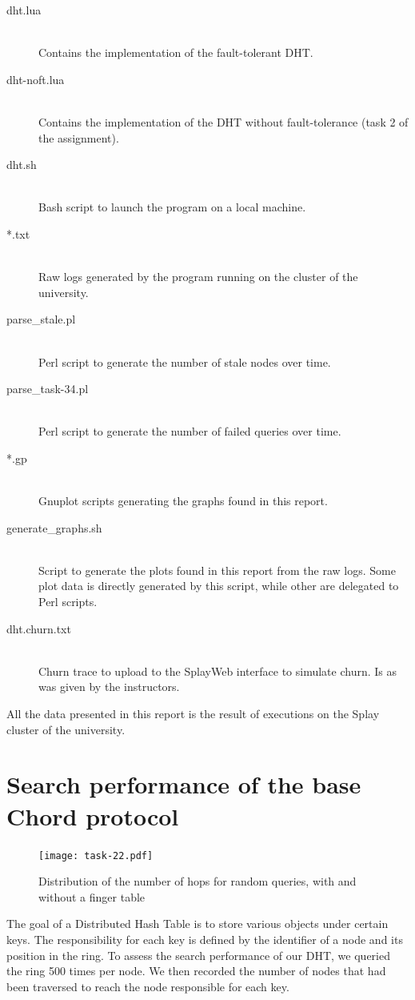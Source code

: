 \documentclass[11pt,a4paper,parskip=half]{scrartcl}
\begin{document}
\begin{description}
\item[dht.lua]\hfill\\ Contains the implementation of the fault-tolerant DHT.
\item[dht-noft.lua]\hfill\\ Contains the implementation of the DHT without fault-tolerance (task 2 of the assignment).
\item[dht.sh]\hfill\\ Bash script to launch the program on a local machine.
\item[*.txt]\hfill\\ Raw logs generated by the program running on the cluster of the university.
\item[parse\_stale.pl]\hfill\\ Perl script to generate the number of stale nodes over time.
\item[parse\_task-34.pl]\hfill\\ Perl script to generate the number of failed queries over time.
\item[*.gp]\hfill\\ Gnuplot scripts generating the graphs found in this report.
\item[generate\_graphs.sh]\hfill\\ Script to generate the plots found in this report from the raw logs. Some plot data is directly generated by this script, while other are delegated to Perl scripts.
\item[dht.churn.txt]\hfill\\ Churn trace to upload to the SplayWeb interface to simulate churn. Is as was given by the instructors.
\end{description}

All the data presented in this report is the result of executions on the Splay cluster of the university.

\section{Search performance of the base Chord protocol}

\begin{figure}
	\centering
	\texttt{[image: task-22.pdf]}
	\caption{Distribution of the number of hops for random queries, with and without a finger table}
	\label{fig:22}
\end{figure}

The goal of a Distributed Hash Table is to store various objects under certain keys.
The responsibility for each key is defined by the identifier of a node and its position in the ring.
To assess the search performance of our DHT, we queried the ring 500 times per node.
We then recorded the number of nodes that had been traversed to reach the node responsible for each key.
\end{document}
